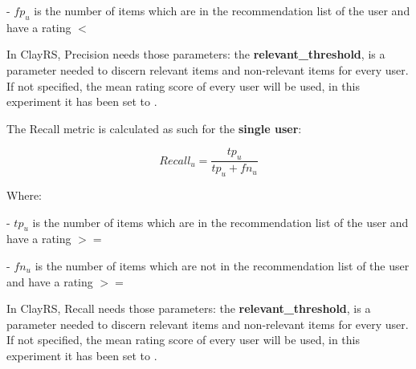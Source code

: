 \documentclass[11pt]{article}
\begin{document}
    - $fp_u$ is the number of items which are in the recommendation list of the user and have a
      rating $<$ 
        \textbf{}
        \textbf{}

\hfill\break

In ClayRS, Precision needs those parameters:
\hfill\break
the \textbf{relevant\_threshold}, is a parameter needed to discern relevant items and non-relevant items for every user.
If not specified, the mean rating score of every user will be used, in this experiment it has been set to
\textbf{}.
\hfill\break



The Recall metric is calculated as such for the \textbf{single user}:

    \[
    Recall_u = \frac{tp_u}{tp_u + fn_u}
    \]

    Where:

    - $tp_u$ is the number of items which are in the recommendation list of the user and have a
      rating $>=$ 
        \textbf{}
        \textbf{}

    - $fn_u$ is the number of items which are not in the recommendation list of the user and have a
      rating $>=$ 
        \textbf{}
        \textbf{}

\hfill\break

In ClayRS, Recall needs those parameters:
\hfill\break
the \textbf{relevant\_threshold}, is a parameter needed to discern relevant items and non-relevant items for every user.
If not specified, the mean rating score of every user will be used, in this experiment it has been set to
\textbf{}.
\hfill\break
\end{document}
